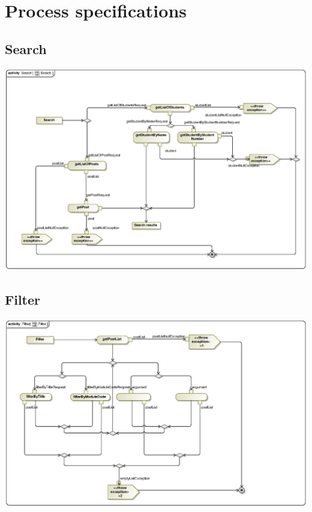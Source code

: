 \documentclass{scrreprt}
\begin{document}
\section{Process specifications}
\subsection{Search}
\includegraphics[scale=.9]{graphics/searchActivityDiagram.eps}\\
\subsection{Filter}
\includegraphics[scale=.9]{graphics/filterActivityDiagram.eps}\\
\end{document}
